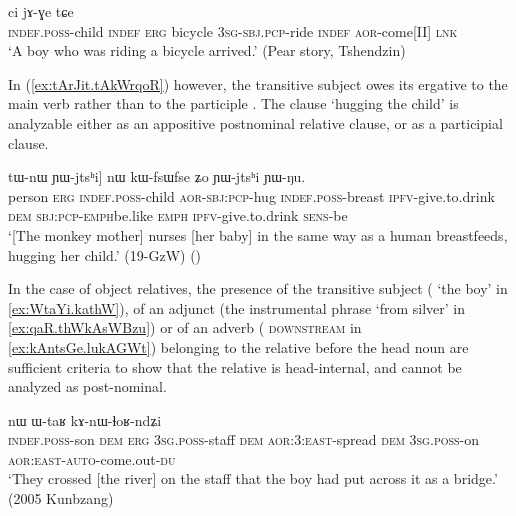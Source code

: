 \begin{exe}
\ex  \label{ex:WkWnWmbrApW}
 ci jɤ-ɣe tɕe \\
 \textsc{indef}.\textsc{poss}-child \textsc{indef} \textsc{erg} bicycle \textsc{3sg}-\textsc{sbj}.\textsc{pcp}-ride \textsc{indef} \textsc{aor}-come[II] \textsc{lnk} \\
\glt `A boy who was riding a bicycle arrived.' (Pear story, Tshendzin)
\end{exe}

In (\ref{ex:tArJit.tAkWrqoR}) however, the transitive subject  owes its ergative to the main verb  rather than to the participle . The clause  `hugging the child' is analyzable either as an appositive postnominal relative clause, or as a participial clause.


\begin{exe}
\ex  \label{ex:tArJit.tAkWrqoR}
\gll  [tɯrme kɯ [tɤ-rɟit tɤ-kɯ-rqoʁ] tɯ-nɯ ɲɯ-jtsʰi] nɯ kɯ-fsɯ\redp{}fse ʑo ɲɯ-jtsʰi ɲɯ-ŋu.\\
person \textsc{erg} \textsc{indef}.\textsc{poss}-child \textsc{aor}-\textsc{sbj}:\textsc{pcp}-hug \textsc{indef}.\textsc{poss}-breast \textsc{ipfv}-give.to.drink \textsc{dem} \textsc{sbj}:\textsc{pcp}-\textsc{emph}\redp{}be.like \textsc{emph} \textsc{ipfv}-give.to.drink \textsc{sens}-be \\
\glt `[The monkey mother] nurses [her baby] in the same way as a human breastfeeds, hugging her child.' (19-GzW)
()
\end{exe}

In the case of object relatives,  the presence of the transitive subject ( `the boy' in \ref{ex:WtaYi.kathW}), of an adjunct (the instrumental phrase  `from silver' in \ref{ex:qaR.thWkAsWBzu}) or of an adverb ( \textsc{downstream} in \ref{ex:kAntsGe.lukAGWt}) belonging to the relative before the head noun are sufficient criteria to show that the relative is head-internal, and cannot be analyzed as post-nominal.
 
\begin{exe}
\ex \label{ex:WtaYi.kathW}
 nɯ ɯ-taʁ kɤ-nɯ-ɬoʁ-ndʑi   \\
\textsc{indef}.\textsc{poss}-son \textsc{dem} \textsc{erg} \textsc{3sg}.\textsc{poss}-staff \textsc{dem} \textsc{aor}:3\flobv{}:\textsc{east}-spread \textsc{dem} \textsc{3sg}.\textsc{poss}-on \textsc{aor}:\textsc{east}-\textsc{auto}-come.out-\textsc{du} \\
\glt `They crossed [the river] on the staff that the boy had put across it as a bridge.' (2005 Kunbzang)
 \end{exe}  
 
